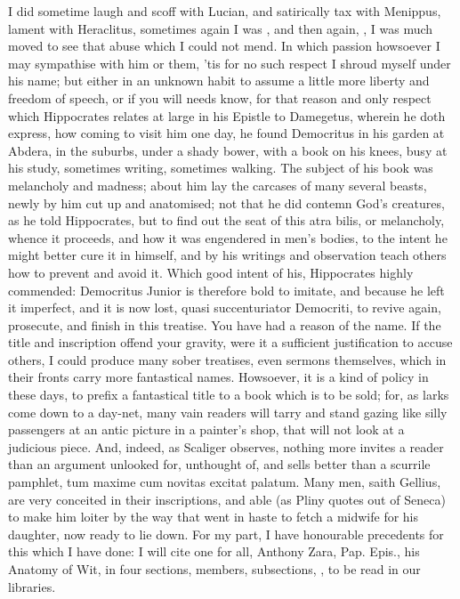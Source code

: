{I did sometime laugh and scoff with Lucian, and satirically tax with
Menippus, lament with Heraclitus, sometimes again I was , and then again, , I was much
moved to see that abuse which I could not mend. In which passion
howsoever I may sympathise with him or them, 'tis for no such respect I
shroud myself under his name; but either in an unknown habit to assume
a little more liberty and freedom of speech, or if you will needs know,
for that reason and only respect which Hippocrates relates at large in
his Epistle to Damegetus, wherein he doth express, how coming to visit
him one day, he found Democritus in his garden at Abdera, in the
suburbs, under a shady bower, with a book on his knees, busy at
his study, sometimes writing, sometimes walking. The subject of his
book was melancholy and madness; about him lay the carcases of many
several beasts, newly by him cut up and anatomised; not that he did
contemn God's creatures, as he told Hippocrates, but to find out the
seat of this atra bilis, or melancholy, whence it proceeds, and how it
was engendered in men's bodies, to the intent he might better cure it
in himself, and by his writings and observation teach others how to
prevent and avoid it. Which good intent of his, Hippocrates highly
commended: Democritus Junior is therefore bold to imitate, and because
he left it imperfect, and it is now lost, quasi succenturiator
Democriti, to revive again, prosecute, and finish in this treatise.
You have had a reason of the name. If the title and inscription offend
your gravity, were it a sufficient justification to accuse others, I
could produce many sober treatises, even sermons themselves, which in
their fronts carry more fantastical names. Howsoever, it is a kind of
policy in these days, to prefix a fantastical title to a book which is
to be sold; for, as larks come down to a day-net, many vain readers
will tarry and stand gazing like silly passengers at an antic picture
in a painter's shop, that will not look at a judicious piece. And,
indeed, as Scaliger observes, nothing more invites a reader than an
argument unlooked for, unthought of, and sells better than a scurrile
pamphlet, tum maxime cum novitas excitat palatum. Many men, saith
Gellius, are very conceited in their inscriptions, and able (as
Pliny quotes out of Seneca) to make him loiter by the way that went
in haste to fetch a midwife for his daughter, now ready to lie down.
For my part, I have honourable precedents for this which I have
done: I will cite one for all, Anthony Zara, Pap. Epis., his Anatomy of
Wit, in four sections, members, subsections, \etc, to be read in our
libraries.

}
